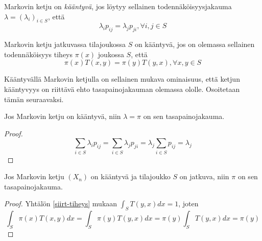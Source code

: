 \begin{maar}\label{kaant-disk}
	Markovin ketju on \textit{kääntyvä}, jos löytyy sellainen todennäköisyysjakauma $\lambda=(\lambda_i)_{i\in S}$, että 
	\begin{equation}
		\lambda_ip_{ij}= \lambda_jp_{ji},\forall i,j\in S
	\end{equation}
\end{maar}

\begin{maar}\label{kaant-jatk}
	Markovin ketju jatkuvassa tilajoukossa $S$ on kääntyvä, jos on olemassa sellainen todennäköisyys tiheys $\pi(x)$ joukossa $S$, että
	\begin{equation}
		\pi(x)T(x,y)=\pi(y)T(y,x), \forall x,y\in S
	\end{equation}
\end{maar}

Kääntyvällä Markovin ketjulla on sellainen mukava ominaisuus, että ketjun kääntyvyys on riittävä ehto tasapainojakauman olemassa ololle. Osoitetaan tämän seuraavaksi.

\begin{lause}
	Jos Markovin ketju on kääntyvä, niin $\lambda=\pi$ on sen tasapainojakauma.
\end{lause}
\begin{proof}
	\begin{equation*}
		\sum_{i\in S} \lambda_i p_{ij} = \sum_{i\in S} \lambda_j p_{ji} = \lambda_j \sum_{i\in S} p_{ij} = \lambda_j
	\end{equation*}
\end{proof}

\begin{lause}
	Jos Markovin ketju $(X_n)$ on kääntyvä ja tilajoukko $S$ on jatkuva, niin $\pi$ on sen tasapainojakauma.
\end{lause}

\begin{proof}
	Yhtälön \ref{siirt-tiheys} mukaan $\int_S T(y,x)dx = 1$, joten
	\begin{equation}
		\int_S \pi(x) T(x,y) dx = \int_S \pi(y) T(y,x) dx = \pi(y)\int_S T(y,x) dx = \pi(y)
	\end{equation}
\end{proof}

